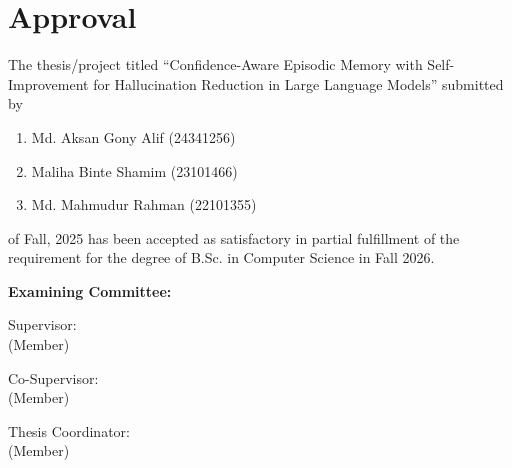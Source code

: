 \section*{Approval}

The thesis/project titled “Confidence-Aware Episodic Memory with Self-Improvement
for Hallucination Reduction in Large Language Models” submitted by 
\begin{enumerate}
  \item Md. Aksan Gony Alif (24341256)
  \item Maliha Binte Shamim (23101466)
  \item Md. Mahmudur Rahman (22101355) 
\end{enumerate}

of Fall, 2025 has been accepted as satisfactory in partial fulfillment of the requirement for the degree of B.Sc. in Computer Science in Fall 2026. 

\vspace{0.5cm}
\textbf{Examining Committee:}

\vspace{1cm}

\noindent Supervisor:\\
(Member)
\begin{center}
    \hspace{7cm}  \hspace{1cm}
\end{center}

\noindent Co-Supervisor:\\
(Member)
\begin{center}
    \hspace{7cm}  \hspace{1cm}
\end{center}


\noindent Thesis Coordinator:\\
(Member)
\begin{center}
    \hspace{7cm}  \hspace{1cm}
\end{center}

